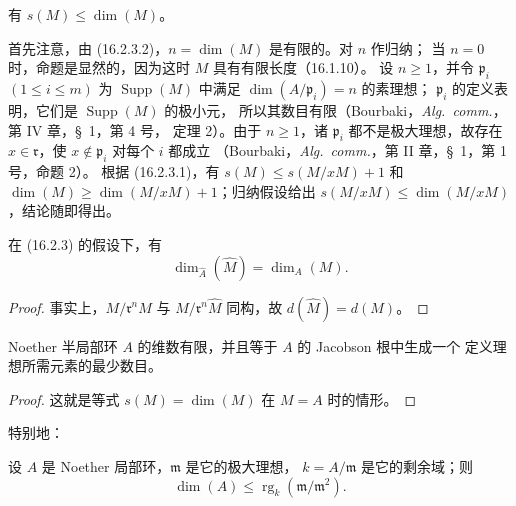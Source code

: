 \begin{env}[16.2.3.4]
\label{0.16.2.3.4-fr}
有 $s(M)\leq\dim(M)$。
\end{env}

首先注意，由 (16.2.3.2)，$n=\dim(M)$ 是有限的。对 $n$ 作归纳；
当 $n=0$ 时，命题是显然的，因为这时 $M$ 具有有限长度（16.1.10）。
设 $n\geq1$，并令 $\mathfrak{p}_i$ $(1\leq i\leq m)$ 为
$\operatorname{Supp}(M)$ 中满足 $\dim(A/\mathfrak{p}_i)=n$ 的素理想；
$\mathfrak{p}_i$ 的定义表明，它们是 $\operatorname{Supp}(M)$ 的极小元，
所以其数目有限（Bourbaki，\emph{Alg.~comm.}，第 IV 章，\S~1，第 4 号，
定理 2）。由于 $n\geq1$，诸 $\mathfrak{p}_i$ 都不是极大理想，故存在
$x\in\mathfrak{r}$，使 $x\notin\mathfrak{p}_i$ 对每个 $i$ 都成立
（Bourbaki，\emph{Alg.~comm.}，第 II 章，\S~1，第 1 号，命题 2）。
根据 (16.2.3.1)，有 $s(M)\leq s(M/xM)+1$ 和
$\dim(M)\geq\dim(M/xM)+1$；归纳假设给出
$s(M/xM)\leq\dim(M/xM)$，结论随即得出。

\begin{corollary}[16.2.4]
\label{0.16.2.4-fr}
在 (16.2.3) 的假设下，有
\begin{equation}
\label{0.16.2.4.1-fr}
\tag{16.2.4.1}
  \dim_{\widehat{A}}(\widehat{M})=\dim_A(M).
\end{equation}
\end{corollary}


\begin{proof}
事实上，$M/\mathfrak{r}^nM$ 与
$\widehat{M}/\mathfrak{r}^n\widehat{M}$ 同构，故
$d(\widehat{M})=d(M)$。
\end{proof}

\begin{corollary}[16.2.5]
\label{0.16.2.5-fr}
Noether 半局部环 $A$ 的维数有限，并且等于 $A$ 的 Jacobson 根中生成一个
定义理想所需元素的最少数目。
\end{corollary}

\begin{proof}
这就是等式 $s(M)=\dim(M)$ 在 $M=A$ 时的情形。
\end{proof}

特别地：

\begin{corollary}[16.2.6]
\label{0.16.2.6-fr}
设 $A$ 是 Noether 局部环，$\mathfrak{m}$ 是它的极大理想，
$k=A/\mathfrak{m}$ 是它的剩余域；则
\begin{equation}
\label{0.16.2.6.1-fr}
\tag{16.2.6.1}
  \dim(A)\leq\operatorname{rg}_k(\mathfrak{m}/\mathfrak{m}^2).
\end{equation}
\end{corollary}

